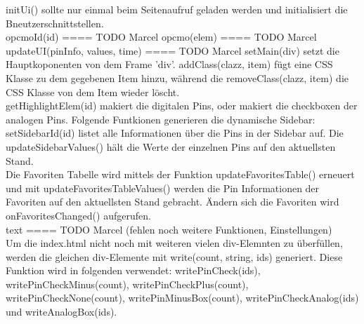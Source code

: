 \textrm{initUi()} sollte nur einmal beim Seitenaufruf geladen werden und
initialisiert die Bneutzerschnittstellen. \\
\textrm{opcmoId(id)}
====
TODO Marcel
\textrm{opcmo(elem)}
====
TODO Marcel
\textrm{updateUI(pinInfo, values, time)}
====
TODO Marcel
\textrm{setMain(div)} setzt die Hauptkoponenten von dem Frame 'div'. 
\textrm{addClass(clazz, item)} fügt eine CSS Klasse zu dem gegebenen Item hinzu,
während die \textrm{removeClass(clazz, item)} die CSS Klasse von dem Item wieder
löscht.\\
\textrm{getHighlightElem(id)} makiert die digitalen Pins, oder makiert die
checkboxen der analogen Pins.
Folgende Funtkionen generieren die dynamische Sidebar: \textrm{setSidebarId(id)}
listet alle Informationen über die Pins in der Sidebar auf. Die
\textrm{updateSidebarValues()} hält die Werte der einzelnen Pins auf den
aktuellsten Stand.\\
Die Favoriten Tabelle wird mittels der Funktion \textrm{updateFavoritesTable()}
erneuert und mit \textrm{updateFavoritesTableValues()} werden die Pin
Informationen der Favoriten auf den aktuellsten Stand gebracht. Ändern sich die
Favoriten wird \textrm{onFavoritesChanged()} aufgerufen.\\
\textrm{text}
====
TODO Marcel (fehlen noch weitere Funktionen, Einstellungen)
\\
Um die index.html nicht noch mit weiteren vielen div-Elemnten zu
überfüllen, werden die gleichen div-Elemente mit \textrm{write(count, string,
ids)} generiert. Diese Funktion wird in folgenden verwendet:
\textrm{writePinCheck(ids)}, \textrm {writePinCheckMinus(count)},
\textrm{writePinCheckPlus(count)}, \textrm{writePinCheckNone(count)},
\textrm{writePinMinusBox(count)}, \textrm{writePinCheckAnalog(ids)} und
\textrm{writeAnalogBox(ids)}. 
\\



